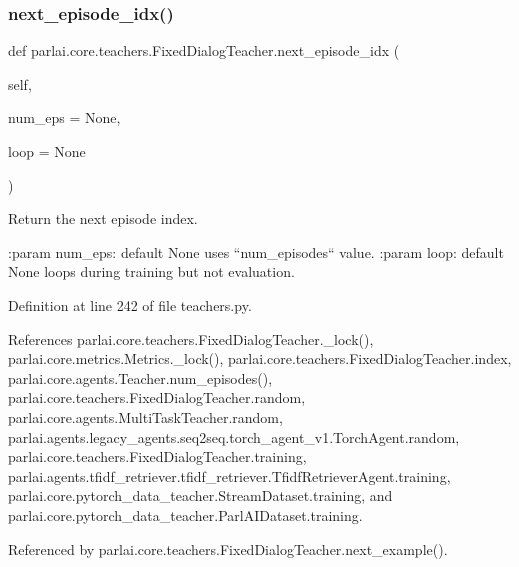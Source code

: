 \subsubsection{\texorpdfstring{next\+\_\+episode\+\_\+idx()}{next\_episode\_idx()}}
{\footnotesize\ttfamily def parlai.\+core.\+teachers.\+Fixed\+Dialog\+Teacher.\+next\+\_\+episode\+\_\+idx (\begin{DoxyParamCaption}\item[{}]{self,  }\item[{}]{num\+\_\+eps = {\ttfamily None},  }\item[{}]{loop = {\ttfamily None} }\end{DoxyParamCaption})}

\begin{DoxyVerb}Return the next episode index.

:param num_eps:
    default None uses ``num_episodes`` value.
:param loop:
    default None loops during training but not evaluation.
\end{DoxyVerb}
 

Definition at line 242 of file teachers.\+py.



References parlai.\+core.\+teachers.\+Fixed\+Dialog\+Teacher.\+\_\+lock(), parlai.\+core.\+metrics.\+Metrics.\+\_\+lock(), parlai.\+core.\+teachers.\+Fixed\+Dialog\+Teacher.\+index, parlai.\+core.\+agents.\+Teacher.\+num\+\_\+episodes(), parlai.\+core.\+teachers.\+Fixed\+Dialog\+Teacher.\+random, parlai.\+core.\+agents.\+Multi\+Task\+Teacher.\+random, parlai.\+agents.\+legacy\+\_\+agents.\+seq2seq.\+torch\+\_\+agent\+\_\+v1.\+Torch\+Agent.\+random, parlai.\+core.\+teachers.\+Fixed\+Dialog\+Teacher.\+training, parlai.\+agents.\+tfidf\+\_\+retriever.\+tfidf\+\_\+retriever.\+Tfidf\+Retriever\+Agent.\+training, parlai.\+core.\+pytorch\+\_\+data\+\_\+teacher.\+Stream\+Dataset.\+training, and parlai.\+core.\+pytorch\+\_\+data\+\_\+teacher.\+Parl\+A\+I\+Dataset.\+training.



Referenced by parlai.\+core.\+teachers.\+Fixed\+Dialog\+Teacher.\+next\+\_\+example().

